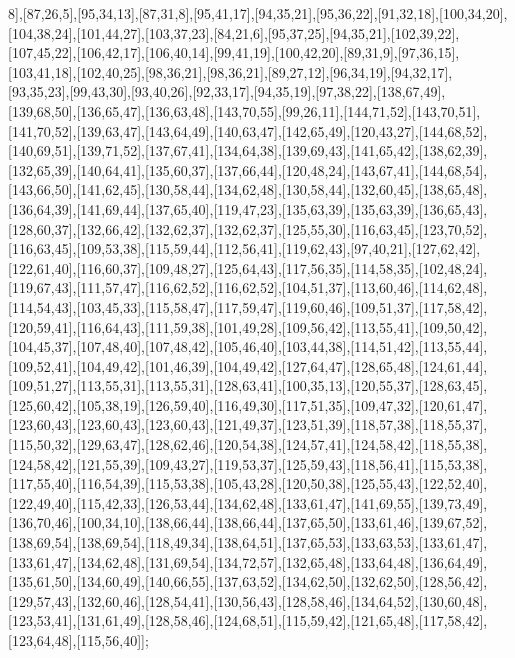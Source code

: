 8],[87,26,5],[95,34,13],[87,31,8],[95,41,17],[94,35,21],[95,36,22],[91,32,18],[100,34,20],[104,38,24],[101,44,27],[103,37,23],[84,21,6],[95,37,25],[94,35,21],[102,39,22],[107,45,22],[106,42,17],[106,40,14],[99,41,19],[100,42,20],[89,31,9],[97,36,15],[103,41,18],[102,40,25],[98,36,21],[98,36,21],[89,27,12],[96,34,19],[94,32,17],[93,35,23],[99,43,30],[93,40,26],[92,33,17],[94,35,19],[97,38,22],[138,67,49],[139,68,50],[136,65,47],[136,63,48],[143,70,55],[99,26,11],[144,71,52],[143,70,51],[141,70,52],[139,63,47],[143,64,49],[140,63,47],[142,65,49],[120,43,27],[144,68,52],[140,69,51],[139,71,52],[137,67,41],[134,64,38],[139,69,43],[141,65,42],[138,62,39],[132,65,39],[140,64,41],[135,60,37],[137,66,44],[120,48,24],[143,67,41],[144,68,54],[143,66,50],[141,62,45],[130,58,44],[134,62,48],[130,58,44],[132,60,45],[138,65,48],[136,64,39],[141,69,44],[137,65,40],[119,47,23],[135,63,39],[135,63,39],[136,65,43],[128,60,37],[132,66,42],[132,62,37],[132,62,37],[125,55,30],[116,63,45],[123,70,52],[116,63,45],[109,53,38],[115,59,44],[112,56,41],[119,62,43],[97,40,21],[127,62,42],[122,61,40],[116,60,37],[109,48,27],[125,64,43],[117,56,35],[114,58,35],[102,48,24],[119,67,43],[111,57,47],[116,62,52],[116,62,52],[104,51,37],[113,60,46],[114,62,48],[114,54,43],[103,45,33],[115,58,47],[117,59,47],[119,60,46],[109,51,37],[117,58,42],[120,59,41],[116,64,43],[111,59,38],[101,49,28],[109,56,42],[113,55,41],[109,50,42],[104,45,37],[107,48,40],[107,48,42],[105,46,40],[103,44,38],[114,51,42],[113,55,44],[109,52,41],[104,49,42],[101,46,39],[104,49,42],[127,64,47],[128,65,48],[124,61,44],[109,51,27],[113,55,31],[113,55,31],[128,63,41],[100,35,13],[120,55,37],[128,63,45],[125,60,42],[105,38,19],[126,59,40],[116,49,30],[117,51,35],[109,47,32],[120,61,47],[123,60,43],[123,60,43],[123,60,43],[121,49,37],[123,51,39],[118,57,38],[118,55,37],[115,50,32],[129,63,47],[128,62,46],[120,54,38],[124,57,41],[124,58,42],[118,55,38],[124,58,42],[121,55,39],[109,43,27],[119,53,37],[125,59,43],[118,56,41],[115,53,38],[117,55,40],[116,54,39],[115,53,38],[105,43,28],[120,50,38],[125,55,43],[122,52,40],[122,49,40],[115,42,33],[126,53,44],[134,62,48],[133,61,47],[141,69,55],[139,73,49],[136,70,46],[100,34,10],[138,66,44],[138,66,44],[137,65,50],[133,61,46],[139,67,52],[138,69,54],[138,69,54],[118,49,34],[138,64,51],[137,65,53],[133,63,53],[133,61,47],[133,61,47],[134,62,48],[131,69,54],[134,72,57],[132,65,48],[133,64,48],[136,64,49],[135,61,50],[134,60,49],[140,66,55],[137,63,52],[134,62,50],[132,62,50],[128,56,42],[129,57,43],[132,60,46],[128,54,41],[130,56,43],[128,58,46],[134,64,52],[130,60,48],[123,53,41],[131,61,49],[128,58,46],[124,68,51],[115,59,42],[121,65,48],[117,58,42],[123,64,48],[115,56,40]];

